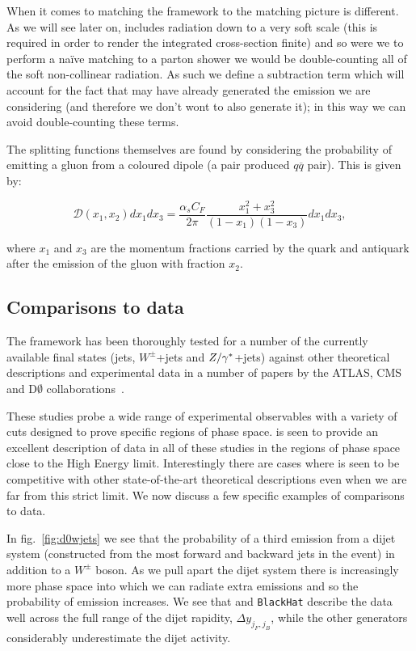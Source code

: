 		When it comes to matching the \hej framework to \ARIADNE the matching picture is different. As we
		will see later on, \HEJ includes radiation down to a very soft scale (this is required in order
		to render the integrated cross-section finite) and so were we to perform a na\"ive matching to a
		parton shower we would be double-counting all of the soft non-collinear radiation. As such we
		define a subtraction term which will account for the fact that \HEJ may have already generated
		the emission we are considering (and therefore we don't wont \ARIADNE to also generate it); in
		this way we can avoid double-counting these terms.

		The splitting functions themselves are found by considering the probability of emitting a gluon
		from a coloured dipole (a pair produced $q\overline{q}$ pair).  This is given by:

		\begin{equation}
			\mathcal{D}(x_1, x_2)dx_1dx_3 = \frac{\alpha_sC_F}{2\pi}\frac{x_1^2+x_3^2}{(1-x_1)(1-x_3)}dx_1dx_3,
		\end{equation}

		where $x_1$ and $x_3$ are the momentum fractions carried by the quark and antiquark after the emission
		of the gluon with fraction $x_2$.

	\subsection{Comparisons to data}

		The \hej framework has been thoroughly tested for a number of the currently available final states (jets,
		$W^\pm$+jets and $Z/\gamma^*$+jets) against other theoretical descriptions and experimental data in a number of
		papers by the ATLAS, CMS and D$\emptyset$ collaborations~\cite{Aad:2011jz,Aad:2014pua,Aad:2014qxa,Aad:2014rta,
		Chatrchyan:2012gwa,Abazov:2013gpa,ZPaper}.

		These studies probe a wide range of experimental observables with a variety of cuts designed to prove
		specific regions of phase space. \hej is seen to provide an excellent description of data in all of these
		studies in the regions of phase space close to the High Energy limit.  Interestingly there are cases where
		\HEJ is seen to be competitive with other state-of-the-art theoretical descriptions even when we are far from
		this strict limit. We now discuss a few specific examples of comparisons to data.

		In fig.~\eqref{fig:d0wjets} we see that the probability of a third emission from a dijet system (constructed
		from the most forward and backward jets in the event) in addition to a $W^\pm$ boson.  As we pull apart the
		dijet system there is increasingly more phase space into which we can radiate extra emissions and so the
		probability of emission increases.  We see that \HEJ and \texttt{BlackHat} describe the data well across
		the full range of the dijet rapidity, $\Delta y_{j_F, j_B}$, while the other generators considerably
		underestimate the dijet activity.

